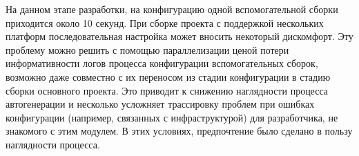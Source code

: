 \par
На данном этапе разработки, на конфигурацию одной вспомогательной сборки приходится около 10 секунд.
При сборке проекта с поддержкой нескольких платформ последовательная настройка может вносить некоторый дискомфорт.
Эту проблему можно решить с помощью параллелизации ценой потери информативности логов процесса конфигурации вспомогательных сборок, возможно даже совместно с их переносом из стадии конфигурации в стадию сборки основного проекта.
Это приводит к снижению наглядности процесса автогенерации и несколько усложняет трассировку проблем при ошибках конфигурации (например, связанных с инфраструктурой) для разработчика, не знакомого с этим модулем.
В этих условиях, предпочтение было сделано в пользу наглядности процесса.


\newpage